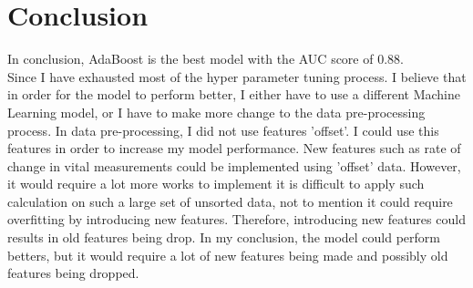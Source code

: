 \documentclass{article}
\begin{document}
\section{Conclusion}
In conclusion, AdaBoost is the best model with the AUC score of 0.88. \\
Since I have exhausted most of the hyper parameter tuning process. I believe that in order for the model to perform better, I either have to use a different Machine Learning model, or I have to make more change to the data pre-processing process. In data pre-processing, I did not use features 'offset'. I could use this features in order to increase my model performance. New features such as rate of change in vital measurements could be implemented using 'offset' data. However, it would require a lot more works to implement it is difficult to apply such calculation on such a large set of unsorted data, not to mention it could require overfitting by introducing new features. Therefore, introducing new features could results in old features being drop. In my conclusion, the model could perform betters, but it would require a lot of new features being made and possibly old features being dropped. 



\end{document}
